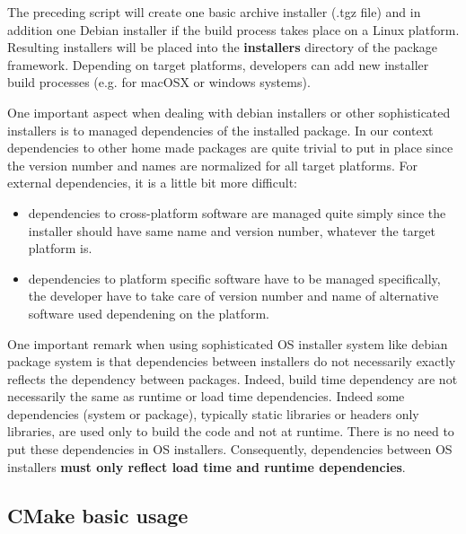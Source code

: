 \documentclass[12pt,a4paper]{article}
\begin{document}
The preceding script will create one basic archive installer (.tgz file) and in addition one Debian installer if the build process takes place on a Linux platform. Resulting installers will be placed into the \textbf{installers} directory of the package framework. Depending on target platforms, developers can add new installer build processes (e.g. for macOSX or windows systems).

One important aspect when dealing with debian installers or other sophisticated installers is to managed dependencies of the installed package. In our context dependencies to other home made packages are quite trivial to put in place since the version number and names are normalized for all target platforms. For external dependencies, it is a little bit more difficult:
\begin{itemize}
\item dependencies to cross-platform software are managed quite simply since the installer should have same name and version number, whatever the target platform is.
\item dependencies to platform specific software have to be managed specifically, the developer have to take care of version number and name of alternative software used dependening on the platform.
\end{itemize}

One important remark when using sophisticated OS installer system like debian package system is that dependencies between installers do not necessarily exactly reflects the dependency between packages. Indeed, build time dependency are not necessarily the same as runtime or load time dependencies. Indeed some  dependencies (system or package), typically static libraries or headers only libraries, are used only to build the code and not at runtime. There is no need to put these dependencies in OS installers. Consequently,  dependencies between OS installers \textbf{must only reflect load time and runtime dependencies}. 

\subsection{CMake basic usage}
\end{document}
